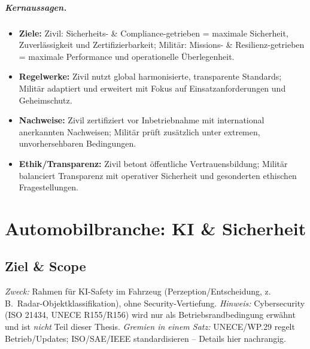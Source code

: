 \paragraph{Kernaussagen.}
\begin{itemize}
  \item \textbf{Ziele:} Zivil: Sicherheits- \& Compliance-getrieben = maximale Sicherheit, Zuverlässigkeit und Zertifizierbarkeit; Militär: Missions- \& Resilienz-getrieben = maximale Performance und operationelle Überlegenheit.
  \item \textbf{Regelwerke:} Zivil nutzt global harmonisierte, transparente Standards; Militär adaptiert und erweitert mit Fokus auf Einsatzanforderungen und Geheimschutz.
  \item \textbf{Nachweise:} Zivil zertifiziert vor Inbetriebnahme mit international anerkannten Nachweisen; Militär prüft zusätzlich unter extremen, unvorhersehbaren Bedingungen.
  \item \textbf{Ethik/Transparenz:} Zivil betont öffentliche Vertrauensbildung; Militär balanciert Transparenz mit operativer Sicherheit und gesonderten ethischen Fragestellungen.
\end{itemize}










\chapter{Automobilbranche: KI \& Sicherheit}

\section{Ziel \& Scope}
\textit{Zweck:} Rahmen für KI-Safety im Fahrzeug (Perzeption/Entscheidung, z.\,B.\ Radar-Objektklassifikation), ohne Security-Vertiefung. 
\textit{Hinweis:} Cybersecurity (ISO 21434, UNECE R155/R156) wird nur als Betriebsrandbedingung erwähnt und ist \emph{nicht} Teil dieser Thesis.
\textit{Gremien in einem Satz:} UNECE/WP.29 regelt Betrieb/Updates; ISO/SAE/IEEE standardisieren – Details hier nachrangig.

